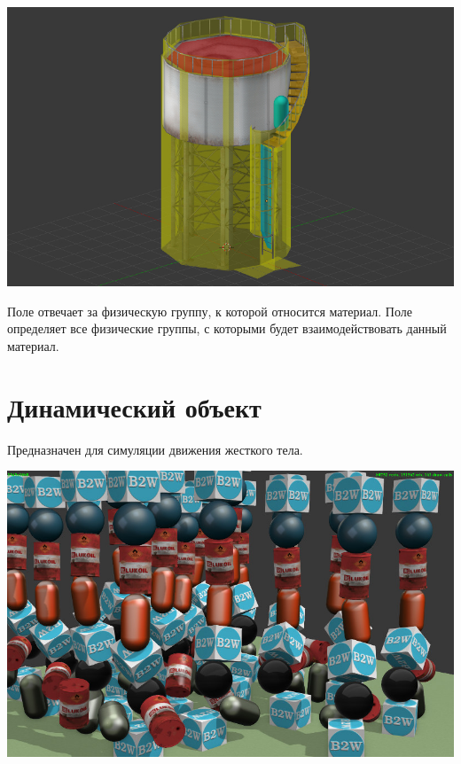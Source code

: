 \documentclass[a4paper,12pt,oneside]{sphinxmanual}
\begin{document}
\includegraphics[width=1.000\linewidth]{physics_water_tower.jpg}

\begin{DUlineblock}{0em}
\item[] 
\end{DUlineblock}

Поле  отвечает за физическую группу, к которой относится материал.
Поле  определяет все физические группы, с которыми будет взаимодействовать данный материал.


\section{Динамический объект}
\label{physics:id4}
Предназначен для симуляции движения жесткого тела.

\includegraphics[width=1.000\linewidth]{physics_dynamic.jpg}

\begin{DUlineblock}{0em}
\item[] 
\end{DUlineblock}
\end{document}
